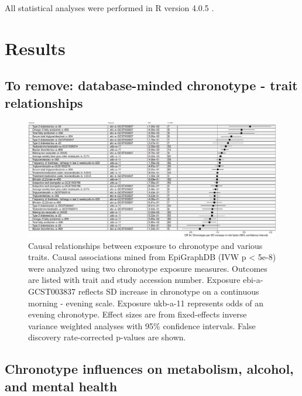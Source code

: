 \documentclass[journal,article,submit,moreauthors,pdftex]{Definitions/mdpi}
\begin{document}
All statistical analyses were performed in R version 4.0.5 \cite{r_core_team_r:_2013}. 



\section{Results}


\subsection{To remove: database-minded chronotype - trait relationships}



\begin{figure}[htbp]
	\centering
	\includegraphics[width=0.99\linewidth]{Figs/Analysis1/forestIVW.pdf}
	\caption{Causal relationships between exposure to chronotype and various traits. Causal associations mined from EpiGraphDB (IVW p < 5e-8) were analyzed using two chronotype exposure measures. Outcomes are listed with trait and study accession number. Exposure ebi-a-GCST003837 reflects SD increase in chronotype on a continuous morning - evening scale. Exposure ukb-a-11 represents odds of an evening chronotype. Effect sizes are from fixed-effects inverse variance weighted analyses with 95\% confidence intervals. False discovery rate-corrected p-values are shown.}
	\label{forestIVW}
\end{figure}

\subsection{Chronotype influences on metabolism, alcohol, and mental health}
\end{document}
